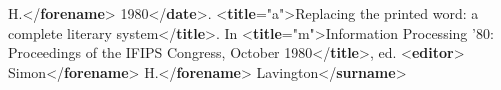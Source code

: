\begin{shaded}
\hspace*{1em}\hspace*{1em}H.{</\textbf{forename}>}\mbox{}\newline 
\hspace*{1em}\mbox{}\newline 
{}\mbox{}\newline 
{}1980{</\textbf{date}>}.\mbox{}\newline 
{<\textbf{title}\hspace*{1em}{level}="{a}">}Replacing the printed word: a complete literary\mbox{}\newline 
\hspace*{1em}\hspace*{1em} system{</\textbf{title}>}. In {<\textbf{title}\hspace*{1em}{level}="{m}">}Information Processing '80: Proceedings of the\mbox{}\newline 
\hspace*{1em}\hspace*{1em} IFIPS Congress, October 1980{</\textbf{title}>},\mbox{}\newline 
 ed.\mbox{}\newline 
{<\textbf{editor}>}\mbox{}\newline 
\hspace*{1em}\mbox{}\newline 
\hspace*{1em}\hspace*{1em}Simon{</\textbf{forename}>}\mbox{}\newline 
\hspace*{1em}\hspace*{1em}H.{</\textbf{forename}>}\mbox{}\newline 
\hspace*{1em}\hspace*{1em}Lavington{</\textbf{surname}>}\mbox{}\newline 

\end{shaded}
